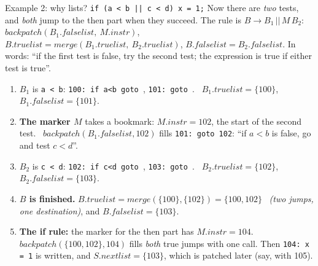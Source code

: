 \documentclass[11pt,a4paper]{article}
\begin{document}
\begin{examplebox}{Example 2: why lists? \texttt{if (a < b || c < d) x = 1;}}
Now there are \emph{two} tests, and \emph{both} jump to the then part when they succeed. The rule is $B\to B_1\,||\,M\,B_2$: $\mathit{backpatch}(B_1.falselist,\ M.instr)$, $B.truelist=\mathit{merge}(B_1.truelist,\ B_2.truelist)$, $B.falselist=B_2.falselist$. In words: ``if the first test is false, try the second test; the expression is true if either test is true''.
\begin{enumerate}[nosep]
\item \textbf{$B_1$} is \texttt{a < b}: \texttt{100: if a<b goto \blk}, \texttt{101: goto \blk}. \ $B_1.truelist=\{100\}$, $B_1.falselist=\{101\}$.
\item \textbf{The marker $M$} takes a bookmark: $M.instr=102$, the start of the second test. \ $\mathit{backpatch}(B_1.falselist,102)$ fills \texttt{101: goto 102}: ``if $a<b$ is false, go and test $c<d$''.
\item \textbf{$B_2$} is \texttt{c < d}: \texttt{102: if c<d goto \blk}, \texttt{103: goto \blk}. \ $B_2.truelist=\{102\}$, $B_2.falselist=\{103\}$.
\item \textbf{$B$ is finished.} $B.truelist=\mathit{merge}(\{100\},\{102\})=\{100,102\}$ \ \emph{(two jumps, one destination)}, and $B.falselist=\{103\}$.
\item \textbf{The \textbf{if} rule:} the marker for the then part has $M.instr=104$. \ $\mathit{backpatch}(\{100,102\},104)$ fills \emph{both} true jumps with one call. Then \texttt{104: x = 1} is written, and $S.nextlist=\{103\}$, which is patched later (say, with 105).
\end{enumerate}
\begin{figure}[H]
\centering
{}
\end{figure}
\end{examplebox}
\end{document}
